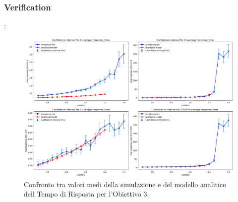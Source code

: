 \subsubsection{Verification}
\begin{frame}{\subsecname: \subsubsecname}
\begin{figure}
    \centering
    \includegraphics[width=0.75\linewidth]{figs/results/obj3/verification/obj3_lineplot_rtime.png}
    \caption{ Confronto tra valori medi della simulazione e del modello analitico dell Tempo di Risposta per l’Obiettivo 3.}
    \label{fig:enter-label}
\end{figure}   
\end{frame}